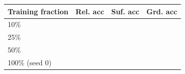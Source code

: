 \begin{tabular}{lccc}
\toprule
\textbf{Training fraction} & \textbf{Rel. acc} & \textbf{Suf. acc} & \textbf{Grd. acc} \\
\midrule
10\% & \ph{--} & \ph{--} & \ph{--} \\
25\% & \ph{--} & \ph{--} & \ph{--} \\
50\% & \ph{--} & \ph{--} & \ph{--} \\
100\% (seed 0) & \ph{--} & \ph{--} & \ph{--} \\
\bottomrule
\end{tabular}
